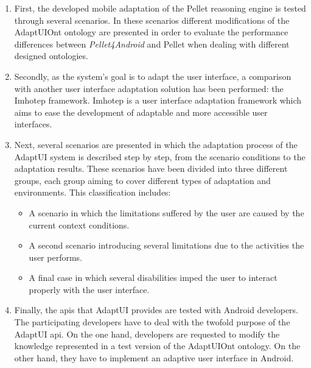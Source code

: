 \begin{enumerate}[label=\alph*)]
  \item First, the developed mobile adaptation of the Pellet reasoning engine 
  is tested through several scenarios. In these scenarios different modifications 
  of the AdaptUIOnt ontology are presented in order to evaluate the performance 
  differences between \textit{Pellet4Android} and Pellet when dealing with different
  designed ontologies.
  
  \item Secondly, as the system's goal is to adapt the user interface, a comparison 
  with another user interface adaptation solution has been performed: the 
  Imhotep framework. Imhotep is a user interface adaptation framework which 
  aims to ease the development of adaptable and more accessible user interfaces.
  
  \item Next, several scenarios are presented in which the adaptation process
  of the AdaptUI system is described step by step, from the scenario conditions
  to the adaptation results. These scenarios have been divided into three 
  different groups, each group aiming to cover different types of adaptation 
  and environments. This classification includes:
  \begin{itemize}
    \item A scenario in which the limitations suffered by the user are caused
    by the current context conditions. 
    
    \item A second scenario introducing several limitations due to the  
    activities the user performs.
    
    \item A final case in which several disabilities imped the user to interact 
    properly with the user interface.
  \end{itemize}
  
  \item Finally, the \acp{api} that AdaptUI provides are tested with Android
  developers. The participating developers have to deal with the twofold purpose
  of the AdaptUI \ac{api}. On the one hand, developers are requested to modify
  the knowledge represented in a test version of the AdaptUIOnt ontology. On the
  other hand, they have to implement an adaptive user interface in Android.
\end{enumerate}

